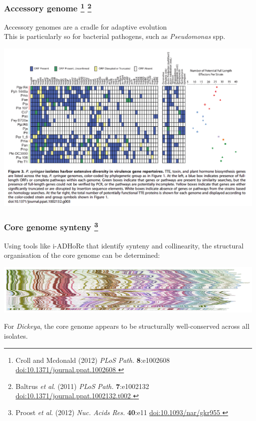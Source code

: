 \begin{frame}
  \frametitle{Accessory genome
   \footnote{\tiny{Croll and Mcdonald (2012) \textit{PLoS Path.} \textbf{8}:e1002608 \href{http://dx.doi.org/10.1371/journal.ppat.1002608}{doi:10.1371/journal.ppat.1002608
  }}}
    \footnote{\tiny{Baltrus \textit{et al}. (2011) \textit{PLoS Path.} \textbf{7}:e1002132 \href{http://dx.doi.org/10.1371/journal.ppat.1002132.t002}{doi:10.1371/journal.ppat.1002132.t002
    }}}  
  }
  Accessory genomes are a cradle for adaptive evolution \\
  \textcolor{hutton_green}{This is particularly so for bacterial pathogens, such as \textit{Pseudomonas} spp.}
  \begin{center}
      \includegraphics[height=0.5\textheight]{images/pa_virulence} 
  \end{center}
\end{frame}

\begin{frame}
  \frametitle{Core genome synteny
    \footnote{\tiny{Proost \textit{et al}. (2012) \textit{Nuc. Acids Res.} \textbf{40}:e11 \href{http://dx.doi.org/10.1093/nar/gkr955}{doi:10.1093/nar/gkr955
    }}}
  }
  Using tools like i-ADHoRe that identify synteny and collinearity, the structural organisation of the core genome can be determined:
  \begin{center}
      \includegraphics[width=1\textwidth]{images/dickeya_core_collinear_small} 
  \end{center}
  For \textit{Dickeya}, the core genome appears to be structurally well-conserved across all isolates.
\end{frame}

